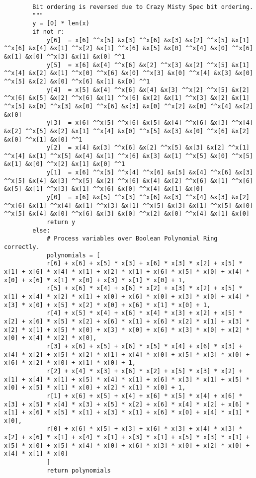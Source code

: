 \begin{lstlisting}
        Bit ordering is reversed due to Crazy Misty Spec bit ordering.
        """
        y = [0] * len(x)
        if not r:
            y[6]  = x[6] ^^x[5] &x[3] ^^x[6] &x[3] &x[2] ^^x[5] &x[1] ^^x[6] &x[4] &x[1] ^^x[2] &x[1] ^^x[6] &x[5] &x[0] ^^x[4] &x[0] ^^x[6] &x[1] &x[0] ^^x[3] &x[1] &x[0] ^^1
            y[5]  = x[6] &x[4] ^^x[6] &x[2] ^^x[3] &x[2] ^^x[5] &x[1] ^^x[4] &x[2] &x[1] ^^x[0] ^^x[6] &x[0] ^^x[3] &x[0] ^^x[4] &x[3] &x[0] ^^x[5] &x[2] &x[0] ^^x[6] &x[1] &x[0] ^^1
            y[4]  = x[5] &x[4] ^^x[6] &x[4] &x[3] ^^x[2] ^^x[5] &x[2] ^^x[6] &x[5] &x[2] ^^x[6] &x[1] ^^x[6] &x[2] &x[1] ^^x[3] &x[2] &x[1] ^^x[5] &x[0] ^^x[3] &x[0] ^^x[6] &x[3] &x[0] ^^x[2] &x[0] ^^x[4] &x[2] &x[0] 
            y[3]  = x[6] ^^x[5] ^^x[6] &x[5] &x[4] ^^x[6] &x[3] ^^x[4] &x[2] ^^x[5] &x[2] &x[1] ^^x[4] &x[0] ^^x[5] &x[3] &x[0] ^^x[6] &x[2] &x[0] ^^x[1] &x[0] ^^1
            y[2]  = x[4] &x[3] ^^x[6] &x[2] ^^x[5] &x[3] &x[2] ^^x[1] ^^x[4] &x[1] ^^x[5] &x[4] &x[1] ^^x[6] &x[3] &x[1] ^^x[5] &x[0] ^^x[5] &x[1] &x[0] ^^x[2] &x[1] &x[0] ^^1
            y[1]  = x[6] ^^x[5] ^^x[4] ^^x[6] &x[5] &x[4] ^^x[6] &x[3] ^^x[5] &x[4] &x[3] ^^x[5] &x[2] ^^x[6] &x[4] &x[2] ^^x[6] &x[1] ^^x[6] &x[5] &x[1] ^^x[3] &x[1] ^^x[6] &x[0] ^^x[4] &x[1] &x[0] 
            y[0]  = x[6] &x[5] ^^x[3] ^^x[6] &x[3] ^^x[4] &x[3] &x[2] ^^x[6] &x[1] ^^x[4] &x[1] ^^x[3] &x[1] ^^x[5] &x[3] &x[1] ^^x[5] &x[0] ^^x[5] &x[4] &x[0] ^^x[6] &x[3] &x[0] ^^x[2] &x[0] ^^x[4] &x[1] &x[0] 
            return y
        else:
            # Process variables over Boolean Polynomial Ring correctly.
            polynomials = [
            r[6] + x[6] + x[5] * x[3] + x[6] * x[3] * x[2] + x[5] * x[1] + x[6] * x[4] * x[1] + x[2] * x[1] + x[6] * x[5] * x[0] + x[4] * x[0] + x[6] * x[1] * x[0] + x[3] * x[1] * x[0] + 1,
            r[5] + x[6] * x[4] + x[6] * x[2] + x[3] * x[2] + x[5] * x[1] + x[4] * x[2] * x[1] + x[0] + x[6] * x[0] + x[3] * x[0] + x[4] * x[3] * x[0] + x[5] * x[2] * x[0] + x[6] * x[1] * x[0] + 1,
            r[4] + x[5] * x[4] + x[6] * x[4] * x[3] + x[2] + x[5] * x[2] + x[6] * x[5] * x[2] + x[6] * x[1] + x[6] * x[2] * x[1] + x[3] * x[2] * x[1] + x[5] * x[0] + x[3] * x[0] + x[6] * x[3] * x[0] + x[2] * x[0] + x[4] * x[2] * x[0],
            r[3] + x[6] + x[5] + x[6] * x[5] * x[4] + x[6] * x[3] + x[4] * x[2] + x[5] * x[2] * x[1] + x[4] * x[0] + x[5] * x[3] * x[0] + x[6] * x[2] * x[0] + x[1] * x[0] + 1,
            r[2] + x[4] * x[3] + x[6] * x[2] + x[5] * x[3] * x[2] + x[1] + x[4] * x[1] + x[5] * x[4] * x[1] + x[6] * x[3] * x[1] + x[5] * x[0] + x[5] * x[1] * x[0] + x[2] * x[1] * x[0] + 1,
            r[1] + x[6] + x[5] + x[4] + x[6] * x[5] * x[4] + x[6] * x[3] + x[5] * x[4] * x[3] + x[5] * x[2] + x[6] * x[4] * x[2] + x[6] * x[1] + x[6] * x[5] * x[1] + x[3] * x[1] + x[6] * x[0] + x[4] * x[1] * x[0],
            r[0] + x[6] * x[5] + x[3] + x[6] * x[3] + x[4] * x[3] * x[2] + x[6] * x[1] + x[4] * x[1] + x[3] * x[1] + x[5] * x[3] * x[1] + x[5] * x[0] + x[5] * x[4] * x[0] + x[6] * x[3] * x[0] + x[2] * x[0] + x[4] * x[1] * x[0]
            ]
            return polynomials



\end{lstlisting}

